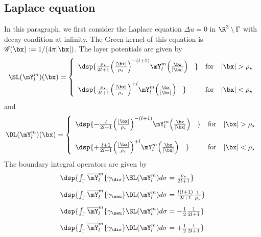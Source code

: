 \documentclass[a4paper,11pt]{article}
\begin{document}
\subsection{Laplace equation}\label{Laplace3D}

In this paragraph, we first consider the Laplace equation $\Delta u = 0$ in $\R^{3}\setminus\Gamma$ with decay
condition at infinity. The Green kernel of this equation is $\mathscr{G}(\bx):= 1/(4\pi\vert\bx\vert)$.
The layer potentials are given by
$$
\SL(\mY_{l}^{m})(\bx) =
\left\{\begin{array}{ll}
\dsp{\frac{\rho_{\star}}{2l+1}\Big(\frac{\vert \bx\vert}{\rho_{\star}}\Big)^{-(l+1)}\mY_{l}^{m}\Big(\frac{\bx}{\vert\bx\vert}\Big)\phantom{\imath\kappa} }
& \textrm{for}\quad \vert \bx\vert> \rho_{\star}\\[15pt]

\dsp{\frac{\rho_{\star}}{2l+1}\Big(\frac{\vert \bx\vert}{\rho_{\star}}\Big)^{+l}\mY_{l}^{m}\Big(\frac{\bx}{\vert\bx\vert}\Big)\phantom{\imath\kappa} }
& \textrm{for}\quad \vert \bx\vert< \rho_{\star}
\end{array}\right.
$$
and
$$
\DL(\mY_{l}^{m})(\bx) =
\left\{\begin{array}{ll}
\dsp{-\frac{l}{2l+1}\Big(\frac{\vert \bx\vert}{\rho_{\star}}\Big)^{-(l+1)}\mY_{l}^{m}\Big(\frac{\bx}{\vert\bx\vert}\Big)\phantom{\imath\kappa} }
& \textrm{for}\quad \vert \bx\vert> \rho_{\star}\\[15pt]

\dsp{+\frac{l+1}{2l+1}\Big(\frac{\vert \bx\vert}{\rho_{\star}}\Big)^{+l}\mY_{l}^{m}\Big(\frac{\bx}{\vert\bx\vert}\Big)\phantom{\imath\kappa} }
& \textrm{for}\quad \vert \bx\vert< \rho_{\star}
\end{array}\right.
$$
The boundary integral operators are given by
$$
\begin{array}{ll}
\dsp{ \int_{\Gamma}\overline{\mY}_{l}^{m}\{\gamma_{\dir}\}\SL(\mY_{l}^{m}) d\sigma
= \frac{\rho_{\star}}{2l+1} }\\[10pt]
\dsp{ \int_{\Gamma}\overline{\mY}_{l}^{m}\{\gamma_{\neu}\}\DL(\mY_{l}^{m}) d\sigma
=  \frac{l(l+1)}{2l+1}\frac{1}{\rho_{\star}}   }\\[10pt]
\dsp{ \int_{\Gamma}\overline{\mY}_{l}^{m}\{\gamma_{\neu}\}\SL(\mY_{l}^{m}) d\sigma
=  -\frac{1}{2}\frac{1}{2l+1} }\\[10pt]
\dsp{ \int_{\Gamma}\overline{\mY}_{l}^{m}\{\gamma_{\dir}\}\DL(\mY_{l}^{m}) d\sigma
=  +\frac{1}{2}\frac{1}{2l+1} }\\[10pt]

\end{array}
$$
\end{document}
